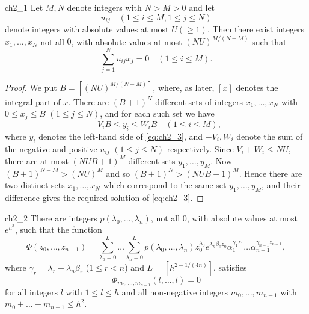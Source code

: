 \begin{mylemma}{}{ch2_1}
Let $M, N$ denote integers with $N > M > 0$ and let
\[
u_{ij} \quad (1 \le i \le M, 1 \le j \le N)
\]
denote integers with absolute values at most $U (\ge 1)$. Then there exist integers $x_1, \dots, x_N$ not all $0$, with absolute values at most $(NU)^{M/(N-M)}$ such that
\begin{equation} \label{eq:ch2_3}\tag{3}
\sum_{j=1}^N u_{ij} x_j = 0 \quad (1 \le i \le M).
\end{equation}
\end{mylemma}

\begin{proof}
We put $B = [(NU)^{M/(N-M)}]$, where, as later, $[x]$ denotes the integral part of $x$. There are $(B+1)^N$ different sets of integers $x_1, \dots, x_N$ with $0 \le x_j \le B$ $(1 \le j \le N)$, and for each such set we have
\[
-V_i B \le y_i \le W_i B \quad (1 \le i \le M),
\]
where $y_i$ denotes the left-hand side of \eqref{eq:ch2_3}, and $-V_i, W_i$ denote the sum of the negative and positive $u_{ij}$ $(1 \le j \le N)$ respectively. Since $V_i + W_i \le NU$, there are at most $(NUB+1)^M$ different sets $y_1, \dots, y_M$. Now $(B+1)^{N-M} > (NU)^M$ and so $(B+1)^N > (NUB+1)^M$. Hence there are two distinct sets $x_1, \dots, x_N$ which correspond to the same set $y_1, \dots, y_M$, and their difference gives the required solution of \eqref{eq:ch2_3}.
\end{proof}

\begin{mylemma}{}{ch2_2}
There are integers $p(\lambda_0, \dots, \lambda_n)$, not all $0$, with absolute values at most $e^{h^3}$, such that the function
\[
\Phi(z_0, \dots, z_{n-1}) = \sum_{\lambda_0=0}^L \dots \sum_{\lambda_n=0}^L p(\lambda_0, \dots, \lambda_n) z_0^{\lambda_0} e^{\lambda_n \beta_0 z_0} \alpha_1^{\gamma_1 z_1} \dots \alpha_{n-1}^{\gamma_{n-1} z_{n-1}},
\]
where $\gamma_r = \lambda_r + \lambda_n \beta_r$ ($1 \le r < n$) and $L = [h^{2-1/(4n)}]$, satisfies
\begin{equation} \label{eq:ch2_4}\tag{4}
\Phi_{m_0, \dots, m_{n-1}}(l, \dots, l) = 0
\end{equation}
for all integers $l$ with $1 \le l \le h$ and all non-negative integers $m_0, \dots, m_{n-1}$ with $m_0 + \dots + m_{n-1} \le h^2$.
\end{mylemma}

